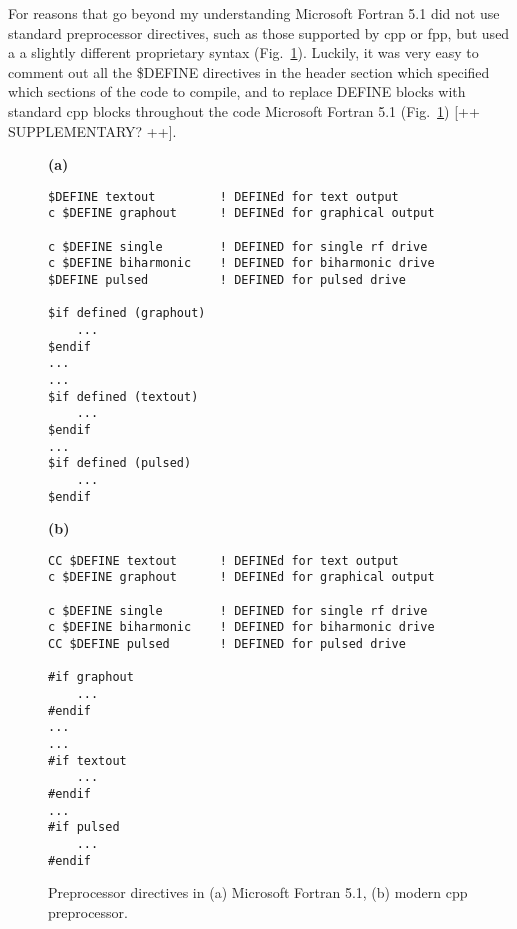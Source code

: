 For reasons that go beyond my understanding Microsoft Fortran 5.1 did not use standard preprocessor directives, such as those supported by \textsf{cpp} or \textsf{fpp}, \cite{Boyanski:1992} but used a a slightly different proprietary syntax (Fig.~\ref{fig:preprocessor}). 
Luckily, it was very easy to comment out all the \textsf{\$DEFINE} directives in the header section which specified which sections of the code to compile, and to replace \textsf{DEFINE} blocks with standard \textsf{cpp} blocks throughout the code Microsoft Fortran 5.1 (Fig.~\ref{fig:preprocessor}) [++ SUPPLEMENTARY? ++]. 


\begin{figure}[b]
\centering

\begin{minipage}{0.48\textwidth}
\textbf{(a)}
\begin{lstlisting}
$DEFINE textout			! DEFINEd for text output
c $DEFINE graphout		! DEFINEd for graphical output

c $DEFINE single        ! DEFINED for single rf drive
c $DEFINE biharmonic    ! DEFINED for biharmonic drive
$DEFINE pulsed			! DEFINED for pulsed drive

$if defined (graphout)
	...
$endif
...
...
$if defined (textout)
	...
$endif
...
$if defined (pulsed)
	...
$endif
\end{lstlisting}
\end{minipage}
%
\hfill
%
\begin{minipage}{0.48\textwidth}
\textbf{(b)}
\begin{lstlisting}
CC $DEFINE textout		! DEFINEd for text output
c $DEFINE graphout		! DEFINEd for graphical output

c $DEFINE single        ! DEFINED for single rf drive
c $DEFINE biharmonic    ! DEFINED for biharmonic drive
CC $DEFINE pulsed		! DEFINED for pulsed drive

#if graphout
	...
#endif
...
...
#if textout
	...
#endif
...
#if pulsed
	...
#endif
\end{lstlisting}
\end{minipage}

\caption{Preprocessor directives in (a) Microsoft Fortran 5.1, (b) modern \textsf{cpp} preprocessor.}
\label{fig:preprocessor}
\end{figure}


